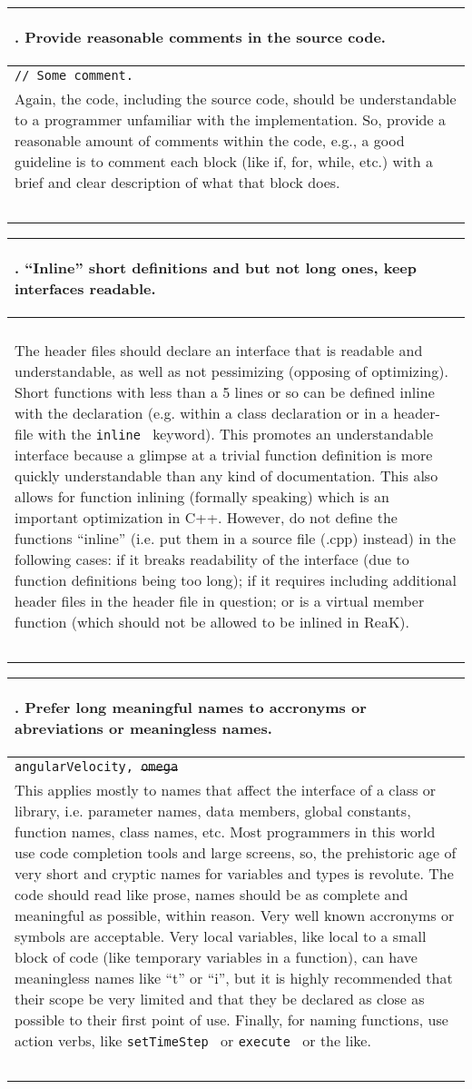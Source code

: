 \documentclass[10pt]{article}
\newcommand{\code}[1]{\color[rgb]{0.2,0.8,0.2}\texttt{#1}\color[rgb]{0,0,0} }
\newcounter {iCommandment}
\newcommand{\CorG}[5]
{
\begin{table}[H]
\begin{center}
\begin{tabular}{| p{12cm} |}
\hline
#1. #2 \\
\hline
\vspace{-0.1cm}
\parbox{12cm}{\code{#3}} \\
\vspace{-0.2cm}
#4 \\
#5 \\
\hline
\end{tabular}
\end{center}
\end{table}
}
\newcommand{\Commandment}[4]
{
\CorG{\textbf{\arabic{iCommandment}}\addtocounter{iCommandment}{1}}
{\textbf{#1}}{#2}{#3}{#4}
}
\begin{document}
\Commandment
{Provide reasonable comments in the source code.}
{// Some comment. }
{ Again, the code, including the source code, should be understandable to a programmer unfamiliar with the 
implementation. So, provide a reasonable amount of comments within the code, e.g., a good guideline is 
to comment each block (like if, for, while, etc.) with a brief and clear description of what that block does. }
{\ }

\Commandment
{``Inline'' short definitions and but not long ones, keep interfaces readable.}
{\ }
{The header files should declare an interface that is readable and understandable, as well as 
not pessimizing (opposing of optimizing). Short functions with less than a 5 lines or so can be defined inline
with the declaration (e.g. within a class declaration or in a header-file with the \code{inline}\ keyword). This 
promotes an understandable interface because a glimpse at a trivial function definition is more quickly understandable 
than any kind of documentation. This also allows for function inlining (formally speaking) which is an important 
optimization in C++. However, do not define the functions ``inline'' (i.e. put them in a source file (.cpp) instead)
in the following cases: if it breaks readability of the 
interface (due to function definitions being too long); if it requires including additional header files in the 
header file in question; or is a virtual member function (which should not be allowed to be inlined in ReaK).}
{\ }

\Commandment
{Prefer long meaningful names to accronyms or abreviations or meaningless names.}
{angularVelocity, \sout{omega} }
{This applies mostly to names that affect the interface of a class or library, i.e. parameter names, 
data members, global constants, function names, class names, etc. Most programmers in this world use 
code completion tools and large screens, so, the prehistoric age of very short and cryptic names for 
variables and types is revolute. The code should read like prose, names should be as complete and meaningful 
as possible, within reason. Very well known accronyms or symbols are acceptable. Very local variables, like 
local to a small block of code (like temporary variables in a function), can have meaningless names like ``t'' 
or ``i'', but it is highly recommended that their scope be very limited and that they be declared as close as 
possible to their first point of use. Finally, for naming functions, use action verbs, like \code{setTimeStep}\ 
or \code{execute}\ or the like.}
{\ }
\end{document}
